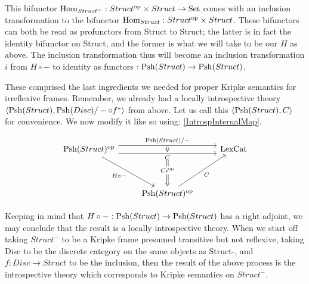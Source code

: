 This bifunctor $\operatorname{Hom}_{Struct^-} : Struct^{\mathrm{op}} \times Struct \to \mathrm{Set}$ comes with an inclusion transformation to the bifunctor $\operatorname{Hom}_{Struct} : Struct^{\mathrm{op}} \times Struct$. These bifunctors can both be read as profunctors from Struct to Struct; the latter is in fact the identity bifunctor on Struct, and the former is what we will take to be our $H$ as above. The inclusion transformation thus will become an inclusion transformation $i$ from $H \circ -$ to identity as functors $: \operatorname{Psh}(Struct) \to \operatorname{Psh}(Struct)$.

These comprised the last ingredients we needed for proper Kripke semantics for irreflexive frames. Remember, we already had a locally introspective theory $\langle \operatorname{Psh}(Struct), \operatorname{Psh}(Disc)/- \circ f^*\rangle$ from above. Let us call this $\langle \operatorname{Psh}(Struct), C \rangle$ for convenience. We now modify it like so using: \cref{IntrospInternalMap}.

\[\begin{tikzcd}
	{\op{\Psh{Struct}}} && \LexCat \\
	\\
	& {\op{\Psh{Struct}}}
	\arrow[""{name=0, anchor=center, inner sep=0}, "{\Psh{Struct}/-}", shift left=2, from=1-1, to=1-3]
	\arrow[""{name=1, anchor=center, inner sep=0}, "C"', shift right=2, from=1-1, to=1-3]
	\arrow["{H \circ -}"', from=1-1, to=3-2]
	\arrow["C"', from=3-2, to=1-3]
	\arrow[shorten <=1pt, shorten >=1pt, Rightarrow, from=0, to=1]
	\arrow["{C \op{i}}"{description}, shorten <=7pt, Rightarrow, from=1, to=3-2]
\end{tikzcd}\]

Keeping in mind that $H \circ - : \operatorname{Psh}(Struct) \to \operatorname{Psh}(Struct)$ has a right adjoint, we may conclude that the result is a locally introspective theory. When we start off taking $Struct^-$ to be a Kripke frame presumed transitive but not reflexive, taking Disc to be the discrete category on the same objects as Struct-, and $f : Disc \to Struct$ to be the inclusion, then the result of the above process is the introspective theory which corresponds to Kripke semantics on $Struct^-$. 

